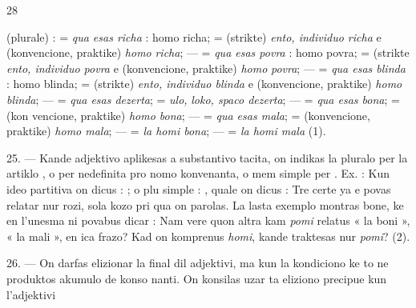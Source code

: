 \begin{VUpage}[32]{28}

\VUcontinue (plurale) :  = \textit{qua esas richa} : homo richa;  =\nl
(strikte) \textit{ento, individuo richa} e (konvencione, praktike) \textit{homo}\nl
\textit{richa}; ---  = \textit{qua esas povra} : homo povra;  =\nl
(strikte \textit{ento, individuo povra} e (konvencione, praktike) \textit{homo}\nl
\textit{povra}; ---  = \textit{qua esas blinda} : homo blinda; \nl
= (strikte) \textit{ento, individuo blinda} e (konvencione, praktike)\nl
\textit{homo blinda}; ---  = \textit{qua esas dezerta};  = \textit{ulo,}\nl
\textit{loko, spaco dezerta}; ---  = \textit{qua esas bona};  = (kon\cc
vencione, praktike) \textit{homo bona}; ---  = \textit{qua esas mala};\nl
{} = (konvencione, praktike) \textit{homo mala}; ---  =\nl
\textit{la homi bona}; ---  = \textit{la homi mala} (1).

\VUblanc{7.75pt}%
25. --- Kande adjektivo aplikesas a substantivo tacita, on\nl
indikas la pluralo per la artiklo , o per nedefinita pro\cc
nomo konvenanta, o mem simple per . Ex. : \nl
{} Kun ideo partitiva on dicus :\nl
{}\nl
{}; o plu simple : , quale on dicus : \nl
{} Tre certe ya  e  povas relatar nur rozi,\nl
sola kozo pri qua on parolas. La lasta exemplo montras\nl
bone, ke en l'unesma ni povabus dicar : \nl
{} Nam vere quon altra kam \textit{pomi} relatus « la\nl
boni », « la mali », en ica frazo? Kad on komprenus \textit{homi},\nl
kande traktesas nur \textit{pomi}? (2).

\VUblanc{8.01pt}%
26. --- On darfas elizionar la  final dil adjektivi, ma\nl
kun la kondiciono ke to ne produktos akumulo de konso\cc
nanti. On konsilas uzar ta eliziono precipue kun l'adjektivi
\parplein
\end{VUpage}

